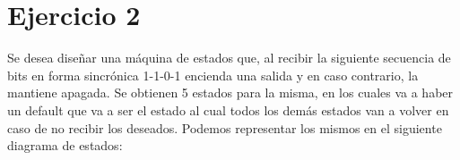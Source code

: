 \chapter{Ejercicio 2}
Se desea diseñar una máquina de estados que, al recibir la siguiente secuencia de bits en forma sincrónica 1-1-0-1 encienda una salida y en caso contrario, la mantiene apagada. Se obtienen 5 estados para la misma, en los cuales va a haber un default que va a ser el estado al cual todos los demás estados van a volver en caso de no recibir los deseados. Podemos representar los mismos en el siguiente diagrama de estados:
